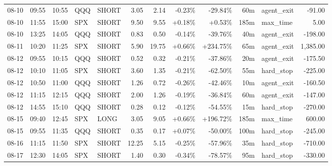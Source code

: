 \documentclass[11pt,a4paper,twoside]{article}
\begin{document}
\begin{center}
\begin{longtable}{>{\color{txtmain}}l l l l l r r r r r >{\color{txtmain}}l r}
08-10 & 09:55 & 10:55 & QQQ & SHORT & 3.05 & 2.14 & \textcolor{lossred}{-0.23\%} & \textcolor{lossred}{-29.84\%} & 60m & agent\_exit & \textcolor{lossred}{-91.00} \\
08-10 & 11:55 & 15:00 & SPX & SHORT & 9.50 & 9.55 & \textcolor{wingreen}{+0.18\%} & \textcolor{wingreen}{+0.53\%} & 185m & max\_time & \textcolor{wingreen}{5.00} \\
08-10 & 13:25 & 14:05 & QQQ & SHORT & 0.83 & 0.50 & \textcolor{lossred}{-0.14\%} & \textcolor{lossred}{-39.76\%} & 40m & agent\_exit & \textcolor{lossred}{-198.00} \\
08-11 & 10:20 & 11:25 & SPX & SHORT & 5.90 & 19.75 & \textcolor{wingreen}{+0.66\%} & \textcolor{wingreen}{+234.75\%} & 65m & agent\_exit & \textcolor{wingreen}{1,385.00} \\
08-12 & 09:55 & 10:15 & QQQ & SHORT & 0.52 & 0.32 & \textcolor{lossred}{-0.21\%} & \textcolor{lossred}{-37.86\%} & 20m & agent\_exit & \textcolor{lossred}{-175.50} \\
08-12 & 10:10 & 11:05 & SPX & SHORT & 3.60 & 1.35 & \textcolor{lossred}{-0.21\%} & \textcolor{lossred}{-62.50\%} & 55m & hard\_stop & \textcolor{lossred}{-225.00} \\
08-12 & 10:50 & 11:00 & QQQ & SHORT & 1.26 & 0.72 & \textcolor{lossred}{-0.26\%} & \textcolor{lossred}{-42.46\%} & 10m & agent\_exit & \textcolor{lossred}{-160.50} \\
08-12 & 11:15 & 12:15 & QQQ & SHORT & 2.00 & 1.26 & \textcolor{lossred}{-0.19\%} & \textcolor{lossred}{-36.84\%} & 60m & agent\_exit & \textcolor{lossred}{-147.00} \\
08-12 & 14:55 & 15:10 & QQQ & SHORT & 0.28 & 0.12 & \textcolor{lossred}{-0.12\%} & \textcolor{lossred}{-54.55\%} & 15m & hard\_stop & \textcolor{lossred}{-270.00} \\
08-15 & 09:40 & 12:45 & SPX & LONG & 3.05 & 9.05 & \textcolor{wingreen}{+0.66\%} & \textcolor{wingreen}{+196.72\%} & 185m & max\_time & \textcolor{wingreen}{600.00} \\
08-15 & 09:55 & 11:35 & QQQ & SHORT & 0.35 & 0.17 & \textcolor{wingreen}{+0.07\%} & \textcolor{lossred}{-50.00\%} & 100m & hard\_stop & \textcolor{lossred}{-245.00} \\
08-16 & 11:15 & 11:50 & SPX & SHORT & 12.25 & 5.15 & \textcolor{lossred}{-0.25\%} & \textcolor{lossred}{-57.96\%} & 35m & hard\_stop & \textcolor{lossred}{-710.00} \\
08-17 & 12:30 & 14:05 & SPX & SHORT & 1.40 & 0.30 & \textcolor{lossred}{-0.34\%} & \textcolor{lossred}{-78.57\%} & 95m & hard\_stop & \textcolor{lossred}{-330.00} \\

\end{longtable}
\end{center}
\end{document}
